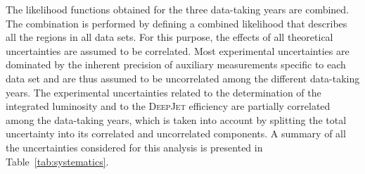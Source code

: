 The likelihood functions obtained for the three data-taking years are combined. The combination is performed by defining a combined likelihood that describes all the regions in all data sets. For this purpose, the effects of all theoretical uncertainties are assumed to be correlated. Most experimental uncertainties are dominated by the inherent precision of auxiliary measurements specific to each data set and are thus assumed to be uncorrelated among the different data-taking years. The experimental uncertainties related to the determination of the integrated luminosity and to the \textsc{DeepJet} efficiency are partially correlated among the data-taking years, which is taken into account by splitting the total uncertainty into its correlated and uncorrelated components. A summary of all the uncertainties considered for this analysis is presented in Table~\ref{tab:systematics}.


